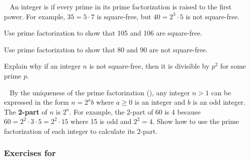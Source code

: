 \begin{exer}[\exerE] %
\label{exer_squarefree}
~
    An integer is  if every prime in its prime factorization is raised to the first power.  For example, $35 = 5 \cdot 7$ is square-free, but $40 = 2^3 \cdot 5$ is not square-free.
        \begin{exerpart}
            \item Use prime factorization to show that 105 and 106 are square-free.
            \item Use prime factorization to show that 80 and 90 are not square-free.
            \item Explain why if an integer $n$ is not square-free, then it is divisible by $p^2$ for some prime $p$.
        \end{exerpart}
\end{exer}

\begin{exer}[\exerE] %
\label{exer_2part}   
~
    By the uniqueness of the prime factorization (), any integer $n > 1$ can be expressed in the form $n = 2^ab$ where $a \ge 0$ is an integer and $b$ is an odd integer. The \textbf{2-part} of $n$ is $2^a$.  For example, the 2-part of 60 is 4 because $60 = 2^2 \cdot 3 \cdot 5=2^2 \cdot 15$ where 15 is odd and $2^2 = 4$.  Show how to use the prime factorization of each integer to calculate its 2-part.
        \begin{exerpart}
            \item {}
            \item {}
            \item {}
        \end{exerpart}
\end{exer}          


\subsubsection*{Exercises for  \subcountdiv}

